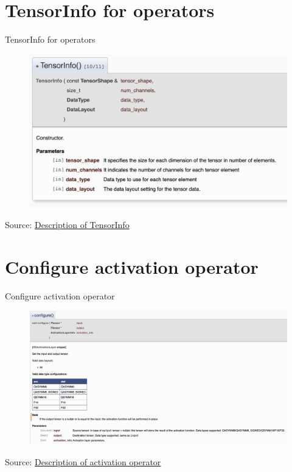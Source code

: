 \documentclass{beamer}
\begin{document}
\section{TensorInfo for operators}
\begin{frame}{TensorInfo for operators}
  \begin{figure}[h]
    \includegraphics[width=1\textwidth]{images/tensorinfo.png}
  \end{figure}
  \footnotesize Source: \href{https://artificial-intelligence.sites.arm.com/computelibrary/latest/classarm__compute_1_1_tensor_info.xhtml}{Description of TensorInfo}
\end{frame}

\section{Configure activation operator}
\begin{frame}{Configure activation operator}
  \begin{figure}[h]
    \includegraphics[width=1\textwidth]{images/config.png}
  \end{figure}
  \footnotesize Source: \href{https://artificial-intelligence.sites.arm.com/computelibrary/latest/classarm__compute_1_1_n_e_activation_layer.xhtml}{Description of activation operator}
\end{frame}
\end{document}

